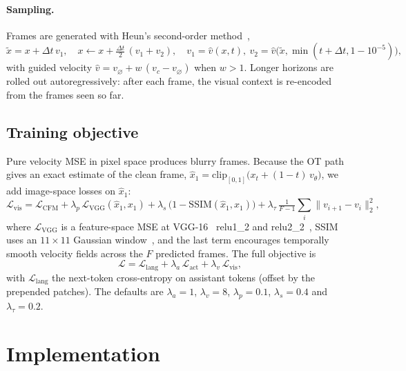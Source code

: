 \documentclass[11pt]{article}
\begin{document}
\paragraph{Sampling.} Frames are generated with Heun's second-order method~\cite{karras2022edm},
\begin{equation}
  \tilde x = x + \Delta t\, v_1,\quad x \leftarrow x + \tfrac{\Delta t}{2}\,(v_1+v_2),\quad
  v_1=\hat v(x,t),\ v_2=\hat v\big(\tilde x,\min(t{+}\Delta t,1{-}10^{-5})\big),
\end{equation}
with guided velocity $\hat v = v_\varnothing + w\,(v_c - v_\varnothing)$ when $w>1$. Longer
horizons are rolled out autoregressively: after each frame, the visual context is
re-encoded from the frames seen so far.

\subsection{Training objective}
\label{sec:losses}

Pure velocity MSE in pixel space produces blurry frames. Because the OT path gives an exact
estimate of the clean frame, $\hat x_1 = \mathrm{clip}_{[0,1]}\big(x_t+(1-t)\,v_\theta\big)$,
we add image-space losses on $\hat x_1$:
\begin{equation}
  \mathcal L_{\text{vis}} = \mathcal L_{\text{CFM}}
  + \lambda_{p}\,\mathcal L_{\text{VGG}}(\hat x_1,x_1)
  + \lambda_{s}\,\big(1-\mathrm{SSIM}(\hat x_1,x_1)\big)
  + \lambda_{\tau}\,\tfrac{1}{F-1}\textstyle\sum_i \lVert v_{i+1}-v_i\rVert_2^2 ,
\end{equation}
where $\mathcal L_{\text{VGG}}$ is a feature-space MSE at VGG-16~\cite{simonyan2015vgg}
relu1\_2 and relu2\_2~\cite{johnson2016perceptual}, SSIM uses an $11\times11$ Gaussian
window~\cite{wang2004ssim}, and the last term encourages temporally smooth velocity fields
across the $F$ predicted frames. The full objective is
\begin{equation}
  \mathcal L = \mathcal L_{\text{lang}} + \lambda_{a}\,\mathcal L_{\text{act}} + \lambda_{v}\,\mathcal L_{\text{vis}},
\end{equation}
with $\mathcal L_{\text{lang}}$ the next-token cross-entropy on assistant tokens (offset by
the prepended patches). The defaults are $\lambda_a=1$, $\lambda_v=8$, $\lambda_p=0.1$,
$\lambda_s=0.4$ and $\lambda_\tau=0.2$.

\section{Implementation}
\end{document}
